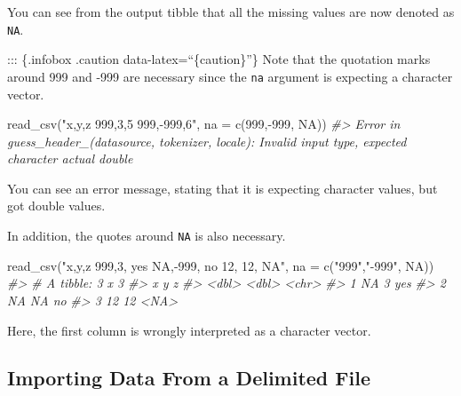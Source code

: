\documentclass[
]{book}
\newenvironment{Shaded}{\begin{snugshade}}{\end{snugshade}}
\newcommand{\AttributeTok}[1]{\textcolor[rgb]{0.77,0.63,0.00}{#1}}
\newcommand{\CommentTok}[1]{\textcolor[rgb]{0.56,0.35,0.01}{\textit{#1}}}
\newcommand{\ConstantTok}[1]{\textcolor[rgb]{0.00,0.00,0.00}{#1}}
\newcommand{\DecValTok}[1]{\textcolor[rgb]{0.00,0.00,0.81}{#1}}
\newcommand{\FunctionTok}[1]{\textcolor[rgb]{0.00,0.00,0.00}{#1}}
\newcommand{\NormalTok}[1]{#1}
\newcommand{\SpecialCharTok}[1]{\textcolor[rgb]{0.00,0.00,0.00}{#1}}
\newcommand{\StringTok}[1]{\textcolor[rgb]{0.31,0.60,0.02}{#1}}
\begin{document}
You can see from the output tibble that all the missing values are now denoted as \texttt{NA}.

::: \{.infobox .caution data-latex=``\{caution\}''\}
Note that the quotation marks around 999 and -999 are necessary since the \texttt{na} argument is expecting a character vector.

\begin{Shaded}
\begin{Highlighting}[]
\FunctionTok{read\_csv}\NormalTok{(}\StringTok{"x,y,z}
\StringTok{          999,3,5}
\StringTok{         999,{-}999,6"}\NormalTok{, }\AttributeTok{na =} \FunctionTok{c}\NormalTok{(}\DecValTok{999}\NormalTok{,}\SpecialCharTok{{-}}\DecValTok{999}\NormalTok{, }\ConstantTok{NA}\NormalTok{))}
\CommentTok{\#\textgreater{} Error in guess\_header\_(datasource, tokenizer, locale): Invalid input type, expected \textquotesingle{}character\textquotesingle{} actual \textquotesingle{}double\textquotesingle{}}
\end{Highlighting}
\end{Shaded}

You can see an error message, stating that it is expecting character values, but got double values.

In addition, the quotes around \texttt{NA} is also necessary.

\begin{Shaded}
\begin{Highlighting}[]
\FunctionTok{read\_csv}\NormalTok{(}\StringTok{"x,y,z}
\StringTok{          999,3, yes}
\StringTok{         NA,{-}999, no}
\StringTok{         12, 12, NA"}\NormalTok{, }\AttributeTok{na =} \FunctionTok{c}\NormalTok{(}\StringTok{"999"}\NormalTok{,}\StringTok{"{-}999"}\NormalTok{, }\ConstantTok{NA}\NormalTok{))}
\CommentTok{\#\textgreater{} \# A tibble: 3 x 3}
\CommentTok{\#\textgreater{}       x     y z    }
\CommentTok{\#\textgreater{}   \textless{}dbl\textgreater{} \textless{}dbl\textgreater{} \textless{}chr\textgreater{}}
\CommentTok{\#\textgreater{} 1    NA     3 yes  }
\CommentTok{\#\textgreater{} 2    NA    NA no   }
\CommentTok{\#\textgreater{} 3    12    12 \textless{}NA\textgreater{}}
\end{Highlighting}
\end{Shaded}

Here, the first column is wrongly interpreted as a character vector.

\hypertarget{importing-data-from-a-delimited-file}{%
\subsection{Importing Data From a Delimited File}\label{importing-data-from-a-delimited-file}}
\end{document}
